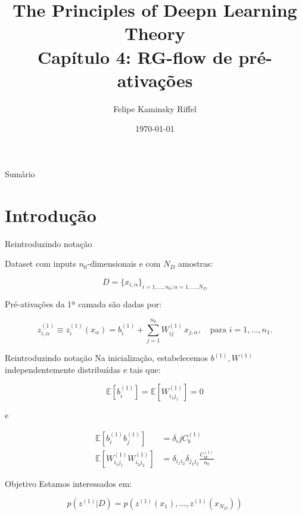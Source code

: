\documentclass{beamer}
\title{
The Principles of Deepn Learning Theory \\    
Capítulo 4: RG-flow de pré-ativações
}
\author{Felipe Kaminsky Riffel}
\date{\today}
\institute{Universidade Federal de Santa Catarina}
\begin{document}
{ 
\frame{\titlepage}}

\begin{frame}{Sumário}
    \tableofcontents
\end{frame}
  

\section{Introdução}
\begin{frame}
\tableofcontents[currentsection]
\end{frame}

\begin{frame}{Reintroduzindo notação}

    Dataset com inputs $n_0$-dimensionais e com $N_D$ amostras: 

    $$
    D = \{x_{i,\alpha}\}_{i=1,\dots,n_0; \alpha=  1, \dots, N_D}
    $$

    Pré-ativações da 1ª camada são dadas por:

    $$
    z^{(1)}_{i,\alpha} \equiv z^{(1)}_i(x_\alpha) = b^{(1)}_i + \sum_{j=1}^{n_0} W^{(1)}_{ij} \, x_{j,\alpha}, \quad \text{para } i = 1, \dots, n_1.
    $$

\end{frame}

\begin{frame}{Reintroduzindo notação}
    Na inicialização, estabelecemos $b^{(1)},W^{(1)}$ independentemente distribuídas e tais que:
    
    $$
    \mathbb E[b_i^{(1)}] = \mathbb E[W_{i_1j_1}^{(1)}] = 0
    $$
    
    e
    
    \begin{align*}
    \mathbb E[b_i^{(1)}b_j^{(1)}] &= \delta_ij C_b^{(1)} \\
    \mathbb E[W_{i_1j_1}^{(1)}W_{i_2j_2}^{(1)}] &= \delta_{i_1i_2}\delta_{j_1j_2} \frac{C_W^{(1)}}{n_0}
    \end{align*}


\end{frame}


\begin{frame}{Objetivo}
    Estamos interessados em:

    $$
    p(z^{(1)}|D) = p(z^{(1)}(x_1),\dots,z^{(1)}(x_{N_D}))
    $$

\end{frame}
\end{document}
